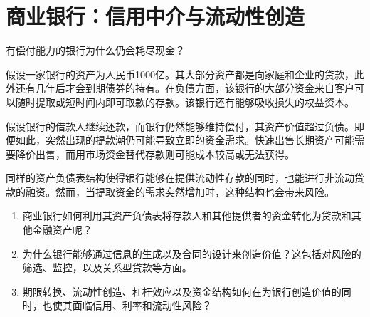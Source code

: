 \chapter{商业银行：信用中介与流动性创造}
\label{chap:Commercial_Banks_Credit_Intermediation_and_Liquidity_Creation}

\begin{openingcase}{有偿付能力的银行为什么仍会耗尽现金？}

假设一家银行的资产为人民币1000亿。其大部分资产都是向家庭和企业的贷款，此外还有几年后才会到期债券的持有。在负债方面，该银行的大部分资金来自客户可以随时提取或短时间内即可取款的存款。该银行还有能够吸收损失的权益资本。

假设银行的借款人继续还款，而银行仍然能够维持偿付，其资产价值超过负债。即便如此，突然出现的提款潮仍可能导致立即的资金需求。快速出售长期资产可能需要降价出售，而用市场资金替代存款则可能成本较高或无法获得。

同样的资产负债表结构使得银行能够在提供流动性存款的同时，也能进行非流动贷款的融资。然而，当提取资金的需求突然增加时，这种结构也会带来风险。

\end{openingcase}


\begin{tcolorbox}[
  enhanced,
  colback=FinanceBlue!6,
  colframe=FinanceBlue,
  boxrule=0.6pt,
  sharp corners,
  left=8pt,
  right=8pt,
  top=7pt,
  bottom=7pt,
  before skip=1em,
  after skip=1.6em,
  title=\textbf{核心问题},
  coltitle=white,
  colbacktitle=FinanceBlue,
  fonttitle=\bfseries,
  attach boxed title to top left={xshift=6pt,yshift=-2mm},
  boxed title style={
    boxrule=0pt,
    sharp corners,
    left=5pt,
    right=5pt,
    top=2pt,
    bottom=2pt
  }
]
\begin{enumerate}[
  leftmargin=*,
  label=\textcolor{FinanceBlue}{\textbf{\arabic*.}},
  itemsep=0.55em,
  topsep=0.2em
]


\item 商业银行如何利用其资产负债表将存款人和其他提供者的资金转化为贷款和其他金融资产呢？

\item 为什么银行能够通过信息的生成以及合同的设计来创造价值？这包括对风险的筛选、监控，以及关系型贷款等方面。

\item 期限转换、流动性创造、杠杆效应以及资金结构如何在为银行创造价值的同时，也使其面临信用、利率和流动性风险？

\end{enumerate}
\end{tcolorbox}

